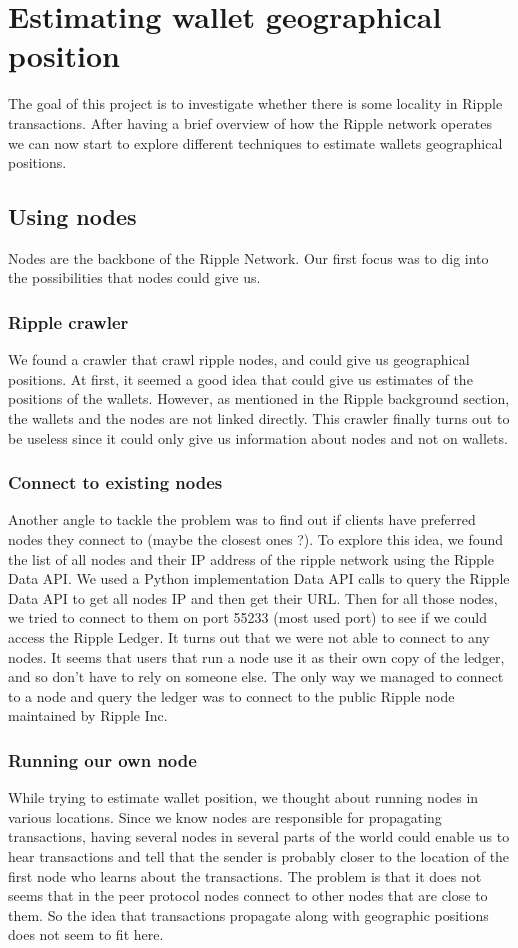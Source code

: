 \section{Estimating wallet geographical position}
The goal of this project is to investigate whether there is some locality in Ripple transactions. After having a brief overview of how the Ripple network operates we can now start to explore different techniques to estimate wallets geographical positions.

\subsection{Using nodes}
Nodes are the backbone of the Ripple Network. Our first focus was to dig into the possibilities that nodes could give us.

\subsubsection{Ripple crawler}
We found a crawler\cite{crawler} that crawl ripple nodes, and could give us geographical positions. At first, it seemed a good idea that could give us estimates of the positions of the wallets. However, as mentioned in the Ripple background section, the wallets and the nodes are not linked directly. This crawler finally turns out to be useless since it could only give us information about nodes and not on wallets.

\subsubsection{Connect to existing nodes}
Another angle to tackle the problem was to find out if clients have preferred nodes they connect to (maybe the closest ones ?). To explore this idea, we found the list of all nodes and their IP address of the ripple network using the Ripple Data API\cite{data-api}. We used a Python implementation Data API calls to query the Ripple Data API to get all nodes IP and then get their URL. Then for all those nodes, we tried to connect to them on port 55233 (most used port) to see if we could access the Ripple Ledger. It turns out that we were not able to connect to any nodes. It seems that users that run a node use it as their own copy of the ledger, and so don't have to rely on someone else. The only way we managed to connect to a node and query the ledger was to connect to the public Ripple node maintained by Ripple Inc. 

\subsubsection{Running our own node}
While trying to estimate wallet position, we thought about running nodes in various locations. Since we know nodes are responsible for propagating transactions, having several nodes in several parts of the world could enable us to hear transactions and tell that the sender is probably closer to the location of the first node who learns about the transactions. The problem is that it does not seems that in the peer protocol nodes connect to other nodes that are close to them. So the idea that transactions propagate along with geographic positions does not seem to fit here.

